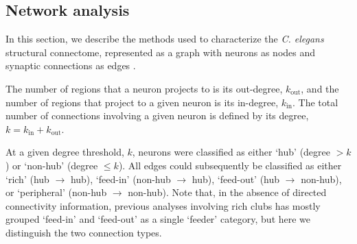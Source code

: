 \documentclass[10pt,letterpaper]{article}
\begin{document}
\subsection*{Network analysis}

In this section, we describe the methods used to characterize the \emph{C. elegans} structural connectome, represented as a graph with neurons as nodes and synaptic connections as edges \cite{Schroter:2017eo}.

The number of regions that a neuron projects to is its out-degree, $k_\mathrm{out}$, and the number of regions that project to a given neuron is its in-degree, $k_\mathrm{in}$.
The total number of connections involving a given neuron is defined by its degree, $k = k_\mathrm{in} + k_\mathrm{out}$.

At a given degree threshold, $k$, neurons were classified as either `hub' (degree $>k$) or `non-hub' (degree $\leq k$).
All edges could subsequently be classified as either `rich' (hub $\rightarrow$ hub), `feed-in' (non-hub $\rightarrow$ hub), `feed-out' (hub $\rightarrow$ non-hub), or `peripheral' (non-hub $\rightarrow$ non-hub).
Note that, in the absence of directed connectivity information, previous analyses involving rich clubs has mostly grouped `feed-in' and `feed-out' as a single `feeder' category, but here we distinguish the two connection types.
\end{document}
